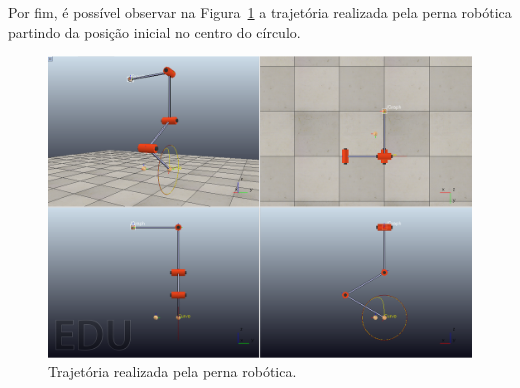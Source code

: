 Por fim, é possível observar na Figura~\ref{fig:ex5} a trajetória realizada pela perna robótica partindo da posição inicial no centro do círculo.

\begin{figure}[H]
	\centering
	\includegraphics[width=0.75\linewidth]{img/ex5}
	\caption{Trajetória realizada pela perna robótica.}
	\label{fig:ex5}
\end{figure}

